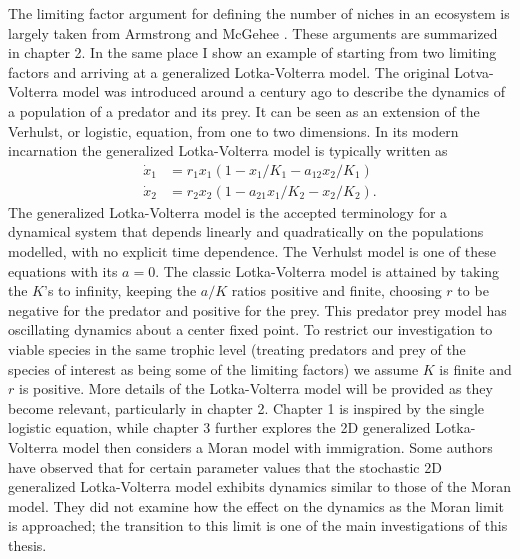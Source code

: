 The limiting factor argument for defining the number of niches in an ecosystem is largely taken from Armstrong and McGehee \cite{Armstrong1976,McGehee1977a,Armstrong1980}. 
These arguments are summarized in chapter 2. %
In the same place I show an example of starting from two limiting factors and arriving at a generalized Lotka-Volterra model. 
%
The original Lotva-Volterra model was introduced around a century ago to describe the dynamics of a population of a predator and its prey.
It can be seen as an extension of the Verhulst, or logistic, equation, from one to two dimensions.
In its modern incarnation the generalized Lotka-Volterra model is typically written as 
\begin{align*}
\dot{x}_1 &= r_1 x_1 \left(1 - x_1/K_1 - a_{12}x_2/K_1\right) \\
\dot{x}_2 &= r_2 x_2 \left(1 - a_{21}x_1/K_2 - x_2/K_2\right). 
\end{align*}
The generalized Lotka-Volterra model is the accepted terminology for a dynamical system that depends linearly and quadratically on the populations modelled, with no explicit time dependence. 
The Verhulst model is one of these equations with its $a=0$. 
The classic Lotka-Volterra model is attained by taking the $K$'s to infinity, keeping the $a/K$ ratios positive and finite, choosing $r$ to be negative for the predator and positive for the prey. 
This predator prey model has oscillating dynamics about a center fixed point. 
To restrict our investigation to viable species in the same trophic level (treating predators and prey of the species of interest as being some of the limiting factors) we assume $K$ is finite and $r$ is positive. 
More details of the Lotka-Volterra model will be provided as they become relevant, particularly in chapter 2. %
Chapter 1 is inspired by the single logistic equation, while chapter 3 further explores the 2D generalized Lotka-Volterra model then considers a Moran model with immigration. 
Some authors \cite{Lin2012,Constable2015,Chotibut2015,Young2018} have observed that for certain parameter values that the stochastic 2D generalized Lotka-Volterra model exhibits dynamics similar to those of the Moran model. 
They did not examine how the effect on the dynamics as the Moran limit is approached; the transition to this limit is one of the main investigations of this thesis. 

